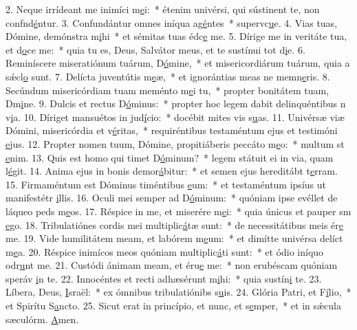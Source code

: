 2. Neque irrídeant me inimíci m\uline{e}i:~* étenim univérsi, qui sústinent te, non confnd\uline{é}ntur.
3. Confundántur omnes iníqua ag\uline{é}ntes~* supervc\uline{u}e.
4. Vias tuas, Dómine, demónstra m\uline{i}hi~* et sémitas tuas édc\uline{e} me.
5. Dírige me in veritáte tua, et d\uline{o}ce me:~* quia tu es, Deus, Salvátor meus, et te sustínui tot d\uline{i}e.
6. Reminíscere miseratiónum tuárum, D\uline{ó}mine,~* et misericordiárum tuárum, quia a sǽcl\uline{o} sunt.
7. Delícta juventútis m\uline{e}æ,~* et ignorántias meas ne memn\uline{e}ris.
8. Secúndum misericórdiam tuam meménto m\uline{e}i tu,~* propter bonitátem tuam, Dm\uline{i}ne.
9. Dulcis et rectus D\uline{ó}minus:~* propter hoc legem dabit delinquéntibus n v\uline{i}a.
10. Díriget mansuétos in jud\uline{í}cio:~* docébit mites vis s\uline{u}as.
11. Univérsæ viæ Dómini, misericórdia et v\uline{é}ritas,~* requiréntibus testaméntum ejus et testimóni \uline{e}jus.
12. Propter nomen tuum, Dómine, propitiáberis peccáto m\uline{e}o:~* multum st \uline{e}nim.
13. Quis est homo qui timet D\uline{ó}minum?~* legem státuit ei in via, quam l\uline{é}git.
14. Anima ejus in bonis demor\uline{á}bitur:~* et semen ejus hereditábt t\uline{e}rram.
15. Firmaméntum est Dóminus timéntibus \uline{e}um:~* et testaméntum ipsíus ut manifestétr \uline{i}llis.
16. Oculi mei semper ad D\uline{ó}minum:~* quóniam ipse evéllet de láqueo peds m\uline{e}os.
17. Réspice in me, et miserére m\uline{e}i:~* quia únicus et pauper sm \uline{e}go.
18. Tribulatiónes cordis mei multiplic\uline{á}tæ sunt:~* de necessitátibus meis ér\uline{e} me.
19. Vide humilitátem meam, et labórem m\uline{e}um:~* et dimítte univérsa delíct m\uline{e}a.
20. Réspice inimícos meos quóniam multiplic\uline{á}ti sunt:~* et ódio iníquo odr\uline{u}nt me.
21. Custódi ánimam meam, et éru\uline{e} me:~* non erubéscam quóniam speráv \uline{i}n te.
22. Innocéntes et recti adhæsérunt m\uline{i}hi:~* quia sustín\uline{i} te.
23. Líbera, Deus, \uline{I}sraël:~* ex ómnibus tribulatiónibs s\uline{u}is.
24. Glória Patri, et F\uline{í}lio,~* et Spirítu S\uline{a}ncto.
25. Sicut erat in princípio, et nunc, et s\uline{e}mper,~* et in sǽcula sæculórm. \uline{A}men.
